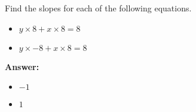  Find the slopes for each of the following equations. \begin{itemize}\item \( y \times 8 + x \times 8 = 8 \)\item \( y \times -8 + x \times 8 = 8 \)\end{itemize}

        \textbf{Answer:} \begin{itemize}\item \( -1 \)\item \( 1 \)\end{itemize}
